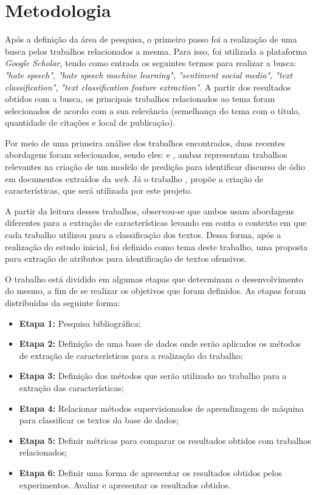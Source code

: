 \chapter{Metodologia}\label{cap:metodologia}
Após a definição da área de pesquisa, o primeiro passo foi a realização de uma busca pelos trabalhos relacionados a mesma. Para isso, foi utilizada a plataforma \textit{Google Scholar}, tendo como entrada os seguintes termos para realizar a busca: {\it "hate speech", "hate speech machine learning", "sentiment social media", "text classification", "text classification feature extraction".} A partir dos resultados obtidos com a busca, os principais trabalhos relacionados ao tema foram selecionados de acordo com a sua relevância (semelhança do tema com o título, quantidade de citações e local de publicação).

Por meio de uma primeira análise dos trabalhos encontrados, duas recentes abordagens foram selecionados, sendo eles: \cite{davidson2017automated} e \cite{nobata2016abusive}, ambas representam trabalhos relevantes na criação de um modelo de predição para identificar discurso de ódio em documentos extraídos da \textit{web}. Já o trabalho  \cite{canutoestudo}, propõe a criação de características, que será utilizada por este projeto. 

A partir da leitura desses trabalhos, observou-se que ambos usam abordagens diferentes para a extração de características levando em conta o contexto em que cada trabalho utilizou para a classificação dos textos. Dessa forma, após a realização do estudo inicial, foi definido como tema deste trabalho, uma proposta para extração de atributos para identificação de textos ofensivos. 

O trabalho está dividido em algumas etapas que determinam o desenvolvimento do mesmo, a fim de se realizar os objetivos que foram definidos. As etapas foram distribuídas da seguinte forma:

\begin{itemize}
    \item \textbf{Etapa 1:} Pesquisa bibliográfica;
    \item \textbf{Etapa 2:} Definição de uma base de dados onde serão aplicados os métodos de extração de características para a realização do trabalho;
    \item \textbf{Etapa 3:} Definição dos métodos que serão utilizado no trabalho para a extração das características;
    \item \textbf{Etapa 4:} Relacionar métodos supervisionados de aprendizagem de máquina para classificar os textos da base de dados;
    \item \textbf{Etapa 5:} Definir métricas para comparar os resultados obtidos com trabalhos relacionados;
    \item \textbf{Etapa 6:} Definir uma forma de apresentar os resultados obtidos pelos experimentos. Avaliar e apresentar os resultados obtidos.
\end{itemize}


